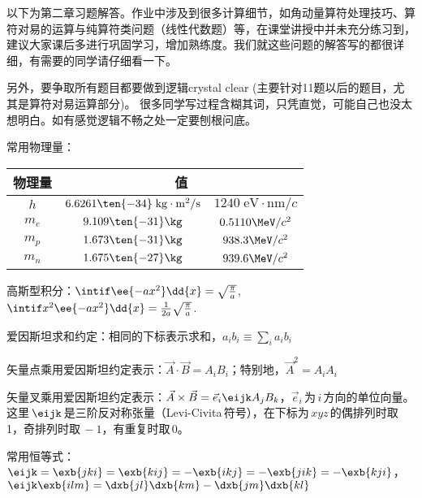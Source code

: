 以下为第二章习题解答。作业中涉及到很多计算细节，{\color{red}如角动量算符处理技巧、算符对易的运算与纯算符类问题（线性代数题）等}，在课堂讲授中并未充分练习到，建议大家课后多进行巩固学习，增加熟练度。我们就这些问题的解答写的都很详细，有需要的同学请仔细看一下。

另外，{\color{red}要争取所有题目都要做到逻辑crystal clear (主要针对11题以后的题目，尤其是算符对易运算部分)。} 很多同学写过程含糊其词，只凭直觉，可能自己也没太想明白。如有感觉逻辑不畅之处一定要刨根问底。

常用物理量：
\begin{table}[h]
    \centering
    \begin{tabular}{|c|c|c|}
        \hline
        物理量 & \multicolumn{2}{|c|}{值} \\
        \hline
        $h$ & $6.6261\ten{-34}\;\mathrm{kg\cdot m^2/s}$ & $1240\;\mathrm{eV\cdot nm}/c$ \\
        $m_e$ & $9.109\ten{-31}\kg$ & $0.5110\MeV/c^2$ \\
        $m_p$ & $1.673\ten{-31}\kg$ & $938.3\MeV/c^2$ \\
        $m_n$ & $1.675\ten{-27}\kg$ & $939.6\MeV/c^2$ \\
        \hline
    \end{tabular}
\end{table}

高斯型积分：$\intif \ee{-ax^2}\dd{x} = \sqrt{\frac{\pi}{a}}$, \quad
$\intif x^2\ee{-ax^2}\dd{x} = \frac{1}{2a}\sqrt{\frac{\pi}{a}}$.

爱因斯坦求和约定：相同的下标表示求和，$a_ib_i\equiv\sum_ia_ib_i$

矢量点乘用爱因斯坦约定表示：$\vec{A}\cdot\vec{B}=A_iB_i$；特别地，$\vec{A}^2=A_iA_i$

矢量叉乘用爱因斯坦约定表示：$\vec{A}\times\vec{B}=\vec{e}_i\eijk A_jB_k$，$\vec{e}_i\,$为$\,i\,$方向的单位向量。这里$\,\eijk\,$是三阶反对称张量（Levi-Civita\,符号），在下标为$\,xyz\,$的偶排列时取\,1，奇排列时取$\,-1$，有重复时取\,0。

常用恒等式：$\eijk=\exb{jki}=\exb{kij}=-\exb{ikj}=-\exb{jik}=-\exb{kji}$，$\eijk\exb{ilm}=\dxb{jl}\dxb{km}-\dxb{jm}\dxb{kl}$


